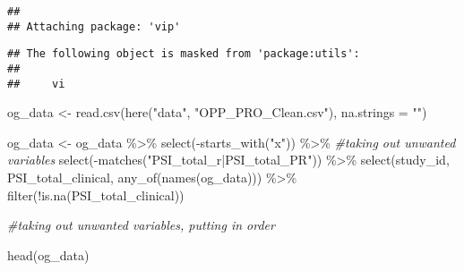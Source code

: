 \documentclass[
]{article}
\newenvironment{Shaded}{\begin{snugshade}}{\end{snugshade}}
\newcommand{\AttributeTok}[1]{\textcolor[rgb]{0.77,0.63,0.00}{#1}}
\newcommand{\CommentTok}[1]{\textcolor[rgb]{0.56,0.35,0.01}{\textit{#1}}}
\newcommand{\FunctionTok}[1]{\textcolor[rgb]{0.00,0.00,0.00}{#1}}
\newcommand{\NormalTok}[1]{#1}
\newcommand{\OtherTok}[1]{\textcolor[rgb]{0.56,0.35,0.01}{#1}}
\newcommand{\SpecialCharTok}[1]{\textcolor[rgb]{0.00,0.00,0.00}{#1}}
\newcommand{\StringTok}[1]{\textcolor[rgb]{0.31,0.60,0.02}{#1}}
\begin{document}
\begin{verbatim}
## 
## Attaching package: 'vip'
\end{verbatim}

\begin{verbatim}
## The following object is masked from 'package:utils':
## 
##     vi
\end{verbatim}

\begin{Shaded}
\begin{Highlighting}[]
\NormalTok{og\_data }\OtherTok{\textless{}{-}} \FunctionTok{read.csv}\NormalTok{(}\FunctionTok{here}\NormalTok{(}\StringTok{"data"}\NormalTok{, }\StringTok{"OPP\_PRO\_Clean.csv"}\NormalTok{), }\AttributeTok{na.strings =} \StringTok{""}\NormalTok{)}

\NormalTok{og\_data }\OtherTok{\textless{}{-}}\NormalTok{ og\_data }\SpecialCharTok{\%\textgreater{}\%} \FunctionTok{select}\NormalTok{(}\SpecialCharTok{{-}}\FunctionTok{starts\_with}\NormalTok{(}\StringTok{"x"}\NormalTok{)) }\SpecialCharTok{\%\textgreater{}\%} \CommentTok{\#taking out unwanted variables}
                        \FunctionTok{select}\NormalTok{(}\SpecialCharTok{{-}}\FunctionTok{matches}\NormalTok{(}\StringTok{"PSI\_total\_r|PSI\_total\_PR"}\NormalTok{)) }\SpecialCharTok{\%\textgreater{}\%}
                         \FunctionTok{select}\NormalTok{(study\_id, PSI\_total\_clinical, }\FunctionTok{any\_of}\NormalTok{(}\FunctionTok{names}\NormalTok{(og\_data))) }\SpecialCharTok{\%\textgreater{}\%}
                          \FunctionTok{filter}\NormalTok{(}\SpecialCharTok{!}\FunctionTok{is.na}\NormalTok{(PSI\_total\_clinical))}


\CommentTok{\#taking out unwanted variables, putting in order}

\FunctionTok{head}\NormalTok{(og\_data)}
\end{Highlighting}
\end{Shaded}
\end{document}
